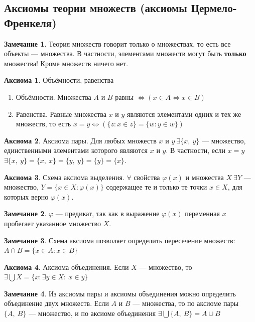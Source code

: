 \documentclass[12pt,oneside]{article}
\theoremstyle{definition}
\newtheorem{axiom}{Аксиома}[section]
\newtheorem{remark}{Замечание}[section]
\begin{document}
\subsection{Аксиомы теории множеств (аксиомы Цермело-Френкеля)}\label{ZFC}
\begin{remark}
Теория множеств говорит только о множествах, то есть все объекты --- множества. В частности, элементами множеств могут быть \textbf{только} множества! Кроме множеств ничего нет.
\end{remark}

    \begin{axiom}{Объёмности, равенства}
\begin{enumerate}
        \item  Объёмности. Множества $A$ и $B$ равны $\Longleftrightarrow (x\in A \Longleftrightarrow x\in B)$
        \item Равенства. Равные множества $x$ и $y$ являются элементами одних и тех же множеств, то есть $x=y \Longleftrightarrow (\{z: x\in z\} = \{w: y\in w\})$
\end{enumerate}
    \end{axiom}
    \begin{axiom}{Аксиома пары.} Для любых множеств $x$ и $y\ \exists \{x,\ y\}$ --- множество, единственными элементами которого являются $x$ и $y$. В частности, если $x=y$ $\exists \{x,\ y\} = \{x,\ x\} = \{y,\ y\}=\{y\}=\{x\}$.
    \end{axiom}
    \begin{axiom}{Схема аксиома выделения.} $\forall$ свойства $\varphi(x)$ и множества $X\ \exists Y$ --- множество, $Y = \{x\in X: \varphi(x)\}$ содержащее те и только те точки $x\in X$, для которых верно $\varphi(x)$.
    \end{axiom}
    \begin{remark}
    $\varphi$ --- предикат, так как в выражение $\varphi(x)$ переменная $x$ пробегает указанное множество $X$.
    \end{remark}
    \begin{remark}
    Схема аксиома позволяет определить пересечение множеств: $A\cap B = \{x\in A: x\in B\}$
    \end{remark}
    \begin{axiom}{Аксиома объединения.} Если $X$ --- множество, то $\exists \bigcup X = \{x: \exists y\in X:\ x\in y\}$
    \end{axiom} 
    \begin{remark}
    Из аксиомы пары и аксиомы объединения можно определить объединение двух множеств. Если $A$ и $B$ --- множества, то по аксиоме пары $\{A,\ B\}$ --- множество, и по аксиоме объединения $\exists \bigcup \{A,\ B\} = A\cup B$
    \end{remark}
\end{document}
